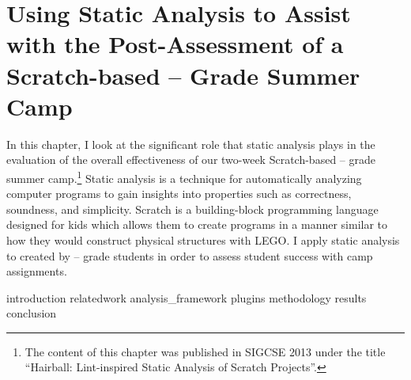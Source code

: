 \chapter{Using Static Analysis to Assist with the Post-Assessment of a
  Scratch-based -- Grade Summer Camp}
\label{chap:hairball}

In this chapter, I look at the significant role that static analysis plays in
the evaluation of the overall effectiveness of our two-week Scratch-based
-- grade summer camp.\footnote{The content of this chapter was
  published in SIGCSE 2013 under the title ``Hairball: Lint-inspired Static
  Analysis of Scratch Projects''.} Static analysis is a technique for
automatically analyzing computer programs to gain insights into properties such
as correctness, soundness, and simplicity. Scratch is a building-block
programming language designed for kids which allows them to create programs in
a manner similar to how they would construct physical structures with
LEGO\textregistered{}. I apply static analysis to  created by
-- grade students in order to assess student success with camp
assignments.

\iffull
\def\currentprefix{hairball}
{introduction}
{relatedwork}
{analysis_framework}
{plugins}
{methodology}
{results}
{conclusion}
\fi

